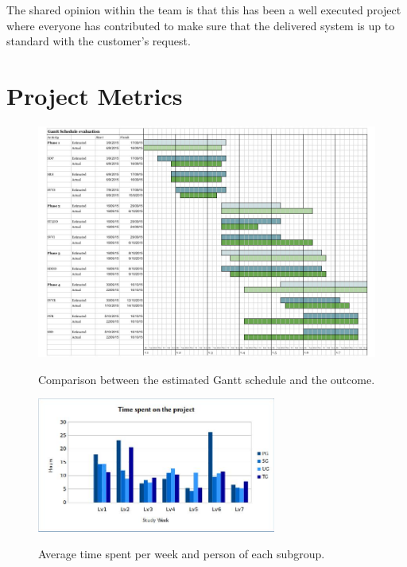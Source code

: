 \documentclass[a4paper]{article}
\begin{document}
The shared opinion within the team is that this has been a well executed project where everyone has contributed to make sure that the delivered system is up to standard with the customer's request.  

\newpage
\section{Project Metrics}
\label{sec:metr}

\begin{figure}[h!]
\includegraphics[width=1.1\textwidth]{gantt.jpg}
\label{fig:gantt}
\caption{Comparison between the estimated Gantt schedule and the outcome.}
\end{figure}

\begin{figure}[h!]
\centering
\includegraphics[width=0.7\textwidth]{time.jpg}
\label{fig:time}
\caption{Average time spent per week and person of each subgroup.}
\end{figure}
\end{document}
